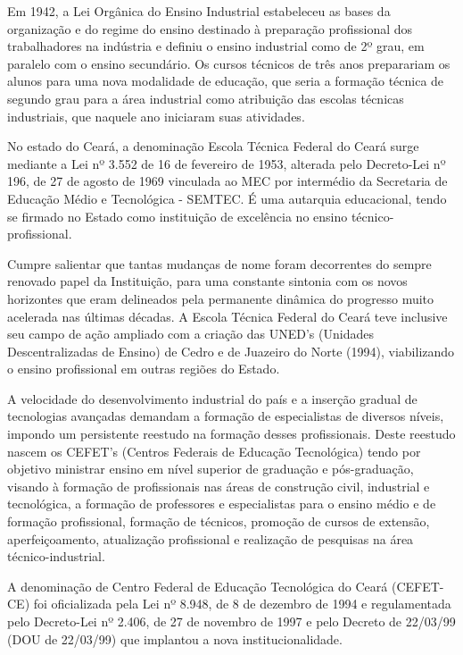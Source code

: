 Em 1942, a Lei Orgânica do Ensino Industrial estabeleceu as bases da organização e do regime do ensino destinado à preparação profissional dos trabalhadores na indústria e definiu o ensino industrial como de 2º grau, em paralelo com o ensino secundário. Os cursos técnicos de três anos preparariam os alunos para uma nova modalidade de educação, que seria a formação técnica de segundo grau para a área industrial como atribuição das escolas técnicas industriais, que
naquele ano iniciaram suas atividades.

No estado do Ceará, a denominação Escola Técnica Federal do Ceará surge mediante a Lei nº 3.552 de 16 de fevereiro de 1953, alterada pelo Decreto-Lei nº 196, de 27 de agosto de 1969 vinculada ao MEC por intermédio da Secretaria de Educação Médio e Tecnológica - SEMTEC. É uma autarquia educacional, tendo se firmado no Estado como instituição de excelência no ensino técnico-profissional.

Cumpre salientar que tantas mudanças de nome foram decorrentes do sempre renovado papel da Instituição, para uma constante sintonia com os novos horizontes que eram delineados pela permanente dinâmica do progresso muito acelerada nas últimas décadas. A Escola Técnica Federal do Ceará teve inclusive seu campo de ação ampliado com a criação das UNED’s (Unidades Descentralizadas de Ensino) de Cedro e de Juazeiro do Norte (1994), viabilizando o ensino profissional em outras regiões do Estado.

A velocidade do desenvolvimento industrial do país e a inserção gradual de tecnologias avançadas demandam a formação de especialistas de diversos níveis, impondo um persistente reestudo na formação desses profissionais. Deste reestudo nascem os CEFET’s (Centros Federais de Educação Tecnológica) tendo por objetivo ministrar ensino em nível superior de graduação e pós-graduação, visando à formação de profissionais nas áreas de construção civil, industrial e tecnológica, a formação de professores e especialistas para o ensino médio e de formação profissional, formação de técnicos, promoção de cursos de extensão, aperfeiçoamento, atualização profissional e realização de pesquisas na área
técnico-industrial.

A denominação de Centro Federal de Educação Tecnológica do Ceará (CEFET-CE) foi oficializada pela Lei nº 8.948, de 8 de dezembro de 1994 e regulamentada pelo Decreto-Lei nº 2.406, de 27 de novembro de 1997 e pelo Decreto de 22/03/99 (DOU
de 22/03/99) que implantou a nova institucionalidade.

